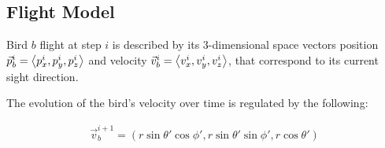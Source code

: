 \subsection{Flight Model}
Bird $b$ flight at step $i$ is described by its $3$-dimensional space vectors
position $\vec{p}_b^i=\expval{p^i_x,p^i_y,p^i_z}$ and velocity
$\vec{v}_b^i=\expval{v^i_x,v^i_y,v^i_z}$, that correspond to its current sight
direction. 


The evolution of the bird's  velocity over time is regulated by
the following:

\begin{align}
\label{eq:birdCumulativeVelocities}
\vec{v}_b^{i+1} = (r \sin \theta' \cos \phi',r \sin \theta' \sin \phi',r
\cos\theta')
\end{align}




